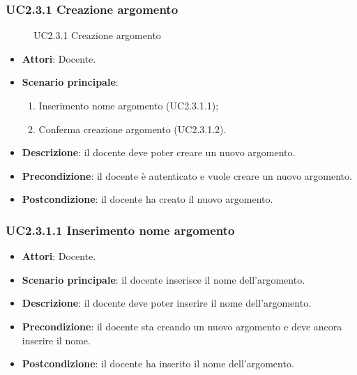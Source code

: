 \subsubsection{UC2.3.1 Creazione argomento}
\begin{figure}[H]
\centering
\noindent{}
\caption{UC2.3.1 Creazione argomento}
\end{figure}
\begin{itemize}
\item \textbf{Attori}: Docente.
\item \textbf{Scenario principale}:
\begin{enumerate}
\item Inserimento nome argomento (UC2.3.1.1);
\item Conferma creazione argomento (UC2.3.1.2).
\end{enumerate}
\item \textbf{Descrizione}: il docente deve poter creare un nuovo argomento.
\item \textbf{Precondizione}: il docente è autenticato e vuole creare un nuovo argomento.
\item \textbf{Postcondizione}: il docente ha creato il nuovo argomento.
\end{itemize}
\subsubsection{UC2.3.1.1 Inserimento nome argomento}
\begin{itemize}
\item \textbf{Attori}: Docente.
\item \textbf{Scenario principale}: il docente inserisce il nome dell'argomento.
\item \textbf{Descrizione}: il docente deve poter inserire il nome dell'argomento.
\item \textbf{Precondizione}: il docente sta creando un nuovo argomento e deve ancora inserire il nome.
\item \textbf{Postcondizione}: il docente ha inserito il nome dell'argomento.
\end{itemize}
